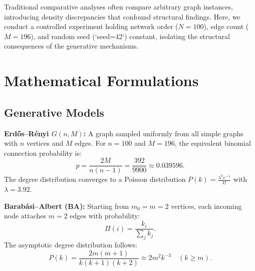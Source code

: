 \documentclass[11pt,a4paper]{article}
\begin{document}
Traditional comparative analyses often compare arbitrary graph instances, introducing density discrepancies that confound structural findings. Here, we conduct a controlled experiment holding network order ($N=100$), edge count ($M=196$), and random seed (`seed=42`) constant, isolating the structural consequences of the generative mechanisms.

\section{Mathematical Formulations}

\subsection{Generative Models}
\textbf{Erd\H{o}s--R\'enyi $G(n, M)$:} A graph sampled uniformly from all simple graphs with $n$ vertices and $M$ edges. For $n=100$ and $M=196$, the equivalent binomial connection probability is:
\begin{equation}
    p = \frac{2M}{n(n-1)} = \frac{392}{9900} \approx 0.039596.
\end{equation}
The degree distribution converges to a Poisson distribution $P(k) = \frac{\lambda^k e^{-\lambda}}{k!}$ with $\lambda = 3.92$.

\textbf{Barab\'asi--Albert (BA):} Starting from $m_0 = m = 2$ vertices, each incoming node attaches $m=2$ edges with probability:
\begin{equation}
    \Pi(i) = \frac{k_i}{\sum_j k_j}.
\end{equation}
The asymptotic degree distribution follows:
\begin{equation}
    P(k) = \frac{2m(m+1)}{k(k+1)(k+2)} \approx 2m^2 k^{-3} \quad (k \ge m).
\end{equation}
\end{document}
